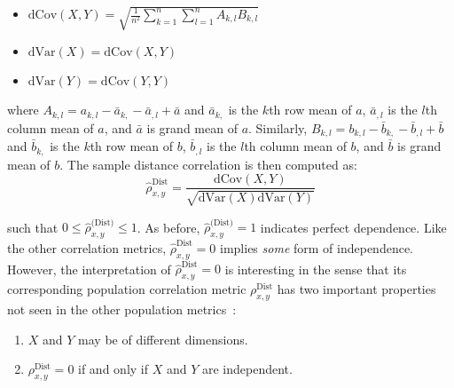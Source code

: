 \tablespacing
\begin{itemize}
	\item $\mathrm{dCov}(X,Y) = \sqrt{\frac{1}{n^2} \sum\limits_{k=1}^{n} 
	\sum\limits_{l=1}^{n} A_{k,l} B_{k,l}}$
	\item $\mathrm{dVar}(X) = \mathrm{dCov}(X,Y)$
	\item $\mathrm{dVar}(Y) = \mathrm{dCov}(Y,Y)$
\end{itemize}
\bodyspacing

\noindent where $A_{k,l}=a_{k,l}-\bar{a}_{k,}-\bar{a}_{,l}+\bar{a}$ and 
$\bar{a}_{k,}$ is the $k$th row mean of $a$, $\bar{a}_{,l}$ is the $l$th column 
mean of $a$, and $\bar{a}$ is grand mean of $a$. 
Similarly, $B_{k,l}=b_{k,l}-\bar{b}_{k,}-\bar{b}_{,l}+\bar{b}$ and 
$\bar{b}_{k,}$ is the $k$th row mean of $b$, $\bar{b}_{,l}$ is the $l$th column 
mean of $b$, and $\bar{b}$ is grand mean of $b$. The sample distance 
correlation is then computed as:
$$\hat{\rho}_{x,y}^{\text{Dist}}=\frac{\mathrm{dCov}(X,Y)}
{\sqrt{\mathrm{dVar}(X)\mathrm{dVar}(Y)}}$$

\noindent 
such that $0 \leq \hat{\rho}_{x,y}^{\text{(Dist)}} \leq 1$. As before, 
$\hat{\rho}_{x,y}^{\text{(Dist)}}=1$ indicates perfect dependence. 
Like the other correlation metrics, $\hat{\rho}_{x,y}^{\text{Dist}}=0$ implies 
\textit{some} form of independence. 
However, the interpretation of $\hat{\rho}_{x,y}^{\text{Dist}}=0$ is
interesting in the sense that its corresponding population correlation metric
$\rho_{x,y}^{\text{Dist}}$ has two important properties not seen in the other 
population metrics~\cite{szekely2007}: 

\tablespacing
\begin{enumerate}
	\item $X$ and $Y$ may be of different dimensions.
	\item$\rho_{x,y}^{\text{Dist}}=0$ if and only if $X$ and $Y$ are 
	independent.
\end{enumerate}
\bodyspacing


